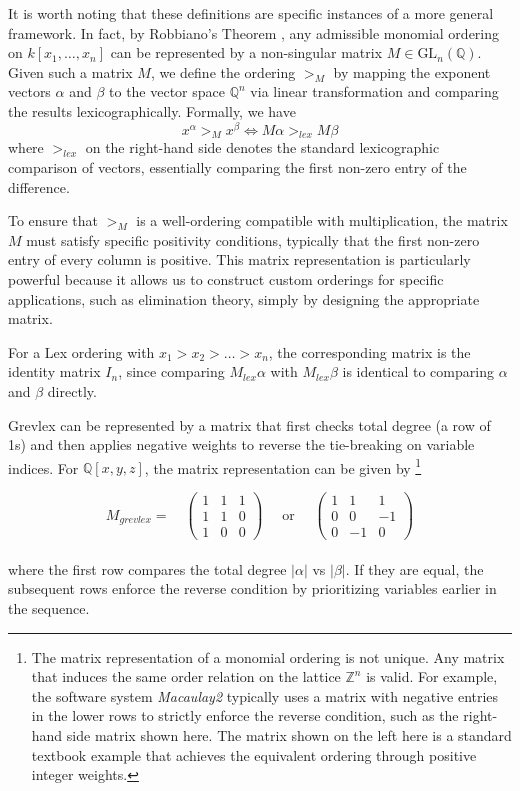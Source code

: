 It is worth noting that these definitions are specific instances of a more general framework. In fact, by Robbiano's Theorem \cite{Robbiano1986_TheoryOfGradedStructures}, any admissible monomial ordering on $k[x_1, \dots, x_n]$ can be represented by a non-singular matrix $M \in \text{GL}_n(\mathbb{Q})$. Given such a matrix $M$, we define the ordering $>_M$ by mapping the exponent vectors $\alpha$ and $\beta$ to the vector space $\mathbb{Q}^n$ via linear transformation and comparing the results lexicographically. Formally, we have
$$
x^\alpha >_M x^\beta \iff M\alpha >_{lex} M\beta
$$
where $>_{lex}$ on the right-hand side denotes the standard lexicographic comparison of vectors, essentially comparing the first non-zero entry of the difference.

To ensure that $>_M$ is a well-ordering compatible with multiplication, the matrix $M$ must satisfy specific positivity conditions, typically that the first non-zero entry of every column is positive. This matrix representation is particularly powerful because it allows us to construct custom orderings for specific applications, such as elimination theory, simply by designing the appropriate matrix.

\begin{example}
    For a Lex ordering with $x_1 > x_2 > \dots > x_n$, the corresponding matrix is the identity matrix $I_n$, since comparing $M_{lex}\alpha$ with $M_{lex}\beta$ is identical to comparing $\alpha$ and $\beta$ directly.

    Grevlex can be represented by a matrix that first checks total degree (a row of 1s) and then applies negative weights to reverse the tie-breaking on variable indices. For $\mathbb{Q}[x, y, z]$, the matrix representation can be given by \footnote{The matrix representation of a monomial ordering is not unique. Any matrix that induces the same order relation on the lattice $\mathbb{Z}^n$ is valid. For example, the software system \textit{Macaulay2} typically uses a matrix with negative entries in the lower rows to strictly enforce the reverse condition, such as the right-hand side matrix shown here. The matrix shown on the left here is a standard textbook example that achieves the equivalent ordering through positive integer weights.}

    $$
    M_{grevlex} = \quad \begin{pmatrix} 1 & 1 & 1 \\ 1 & 1 & 0 \\ 1 & 0 & 0 \end{pmatrix} \quad \text{ or }\quad \begin{pmatrix} 1 & 1 & 1 \\ 0 & 0 & -1 \\ 0 & -1 & 0 \end{pmatrix}
    $$\\
    where the first row compares the total degree $|\alpha|$ vs $|\beta|$. If they are equal, the subsequent rows enforce the reverse condition by prioritizing variables earlier in the sequence.
\end{example}

